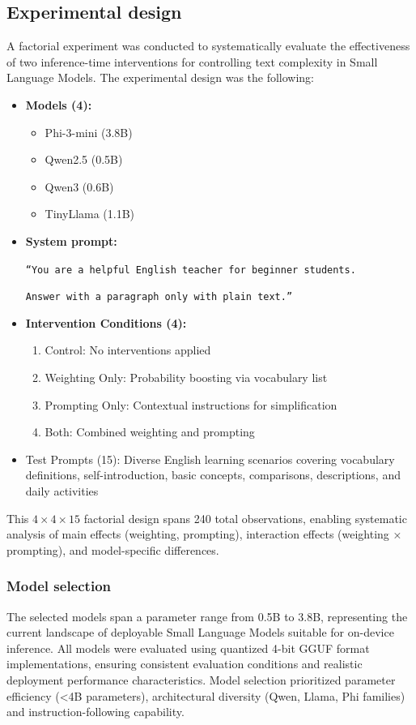 \documentclass[10pt, a4paper]{article}
\let\oldtexttt\texttt
\renewcommand{\texttt}[1]{{\small\oldtexttt{#1}}}
\begin{document}
\subsection{Experimental design}
A factorial experiment was conducted to systematically evaluate the effectiveness of two inference-time interventions for controlling text complexity in Small Language Models. The experimental design was the following:
\begin{itemize}
    \item \textbf{Models (4):}
    \begin{itemize}
        \item Phi-3-mini (3.8B) \cite{abdin2024phi3}
        \item Qwen2.5 (0.5B) \cite{qwen2024qwen25}
        \item Qwen3 (0.6B) \cite{qwen2025qwen3}
        \item TinyLlama (1.1B) \cite{zhang2024tinyllama}
    \end{itemize}
    \item \textbf{System prompt:} 
    
    \texttt{``You are a helpful English teacher for beginner students.} 
    
    \texttt{Answer with a paragraph only with plain text.''}
    \item \textbf{Intervention Conditions (4):} 
    \begin{enumerate}
        \item Control: No interventions applied
        \item Weighting Only: Probability boosting via vocabulary list
        \item Prompting Only: Contextual instructions for simplification
        \item Both: Combined weighting and prompting
    \end{enumerate}
    \item Test Prompts (15): Diverse English learning scenarios covering vocabulary definitions, self-introduction, basic concepts, comparisons, descriptions, and daily activities
\end{itemize}

This $4 \times 4 \times 15$ factorial design spans 240 total observations, enabling systematic analysis of main effects (weighting, prompting), interaction effects (weighting × prompting), and model-specific differences.

\subsubsection{Model selection}
The selected models span a parameter range from 0.5B to 3.8B, representing the current landscape of deployable Small Language Models suitable for on-device inference. All models were evaluated using quantized 4-bit GGUF format implementations, ensuring consistent evaluation conditions and realistic deployment performance characteristics. Model selection prioritized parameter efficiency (<4B parameters), architectural diversity (Qwen, Llama, Phi families) and instruction-following capability.
\end{document}
